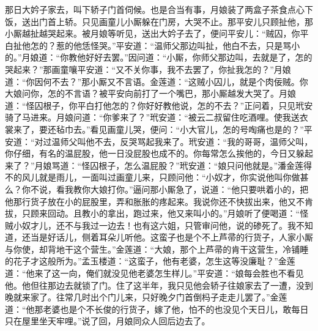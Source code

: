 那日大妗子家去，叫下轿子门首伺候。也是合当有事，月娘装了两盒子茶食点心下饭，送出门首上轿。只见画童儿小厮躲在门房，大哭不止。那平安儿只顾扯他，那小厮越扯越哭起来。被月娘等听见，送出大妗子去了，便问平安儿：“贼囚，你平白扯他怎的？惹的他恁怪哭。”平安道：“温师父那边叫扯，他白不去，只是骂小的。”月娘道：“你教他好好去罢。”因问道：“小厮，你师父那边叫，去就是了，怎的哭起来？”那画童嚷平安道：“又不关你事，我不去罢了，你扯我怎的？”月娘道：“你因何不去？”那小厮又不言语。金莲道：“这贼小囚儿，就是个肉佞贼。你大娘问你，怎的不言语？被平安向前打了一个嘴巴，那小厮越发大哭了。月娘道：“怪囚根子，你平白打他怎的？你好好教他说，怎的不去？”正问着，只见玳安骑了马进来。月娘问道：“你爹来了？”玳安道：“被云二叔留住吃酒哩。使我送衣裳来了，要还毡巾去。”看见画童儿哭，便问：“小大官儿，怎的号啕痛也是的？”平安道：“对过温师父叫他不去，反哭骂起我来了。玳安道：“我的哥哥，温师父叫，你仔细，有名的温屁股，他一日没屁股也成不的。你每常怎么挨他的，今日又躲起来了？”月娘骂道：“怪囚根子，怎么温屁股？”玳安道：“娘只问他就是。”潘金莲得不的风儿就是雨儿，一面叫过画童儿来，只顾问他：“小奴才，你实说他叫你做甚么？你不说，看我教你大娘打你。”逼问那小厮急了，说道：“他只要哄着小的，把他那行货子放在小的屁股里，弄和胀胀的疼起来。我说你还不快拔出来，他又不肯拔，只顾来回动。且教小的拿出，跑过来，他又来叫小的。”月娘听了便喝道：“怪贼小奴才儿，还不与我过一边去！也有这六姐，只管审问他，说的碜死了。我不知道，还当是好话儿，侧着耳朵儿听他。这蛮子也是个不上芦帚的行货子，人家小厮与你使，却背地干这个营生。”金莲道：“大娘，那个上芦帚的肯干这营生，冷铺睡的花子才这般所为。”孟玉楼道：“这蛮子，他有老婆，怎生这等没廉耻？”金莲道：“他来了这一向，俺们就没见他老婆怎生样儿。”平安道：“娘每会胜也不看见他。他但往那边去就锁了门。住了这半年，我只见他会轿子往娘家去了一遭，没到晚就来家了。往常几时出个门儿来，只好晚夕门首倒杩子走走儿罢了。”金莲道：“他那老婆也是个不长俊的行货子，嫁了他，怕不的也没见个天日儿，敢每日只在屋里坐天牢哩。”说了回，月娘同众人回后边去了。

